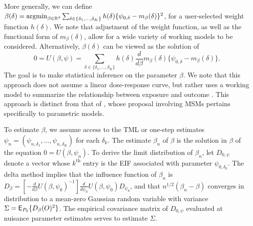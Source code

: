 More generally, we can define $\beta(\delta)=\operatorname*{\arg\!\min}_{\beta \in \mathbb{R}^d}
\sum_{\delta \in \{\delta_1, \ldots, \delta_K\}} h(\delta)\{\psi_{0,\delta}
- m_{\beta}(\delta)\}^2$, for a user-selected weight function $h(\delta)$. We
note that adjustment of the weight function, as well as the functional form of
$m_{\beta}(\delta)$, allow for a wide variety of working models to be
considered. Alternatively, $\beta(\delta)$ can be viewed as the solution of
\begin{equation*}
  0 = U(\beta,\psi) = \sum_{\delta \in \{\delta_1, \ldots, \delta_K\}}
  h(\delta) \frac{d}{d\beta} m_{\beta}(\delta) \{\psi_{0,\delta} -
  m_{\beta}(\delta)\}.
\end{equation*}
The goal is to make statistical inference on the parameter $\beta$. We note that
this approach does not assume a linear dose-response curve, but rather uses
a working model to summarize the relationship between exposure and outcome
\citep{neugebauer2007nonparametric}. This approach is distinct from that of
\citet{haneuse2013estimation}, whose proposal involving MSMs pertains
specifically to parametric models.

To estimate $\beta$, we assume access to the TML or one-step estimates $\psi_n
= (\psi_{n, \delta_1}, \ldots, \psi_{n,\delta_K})$ for each $\delta_k$. The
estimate $\beta_n$ of $\beta$ is the solution in $\beta$ of the equation $0
= U(\beta,\psi_n)$. To derive the limit distribution of $\beta_n$, let
$D_{0,\psi}$ denote a vector whose $k^{\text{th}}$ entry is the EIF associated
with parameter $\psi_{0,\delta_k}$. The delta method implies that the influence
function of $\beta_n$ is $D_{\beta} = [-\frac{d}{d \beta} U(\beta,\psi_0)^{-1}]
\frac{d}{d\psi_0} U(\beta, \psi_0) D_{\psi_0}$, and that $n^{1/2} (\beta_n
- \beta)$ converges in distribution to a mean-zero Gaussian random variable with
variance $\Sigma = \mathsf{E}_{P_0}\{D_{\beta}(O)^2\}$. The empirical covariance matrix
of $D_{0,\psi}$ evaluated at nuisance parameter estimates serves to estimate
$\Sigma$.


